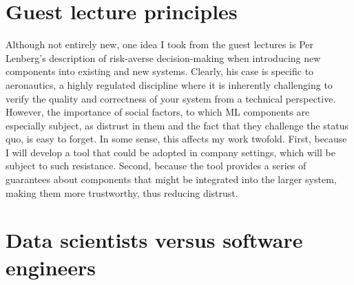 \section*{Guest lecture principles}


    Although not entirely new, one idea I took from the guest lectures is Per Lenberg's description of risk-averse decision-making when introducing new components into existing and new systems.
    Clearly, his case is specific to aeronautics, a highly regulated discipline where it is inherently challenging to verify the quality and correctness of your system from a technical perspective.
    However, the importance of social factors, to which ML components are especially subject, as distrust in them and the fact that they challenge the status quo, is easy to forget.
    In some sense, this affects my work twofold.
    First, because I will develop a tool that could be adopted in company settings, which will be subject to such resistance.
    Second, because the tool provides a series of guarantees about components that might be integrated into the larger system, making them more trustworthy, thus reducing distrust.



\section*{Data scientists versus software engineers}

    
